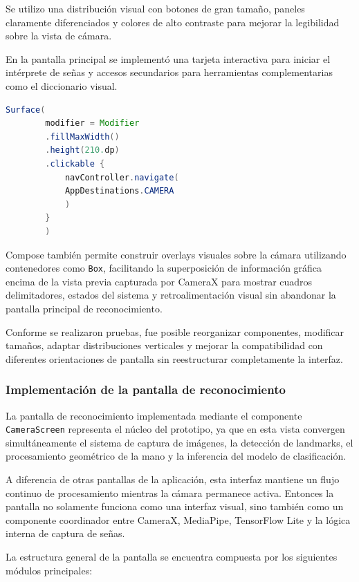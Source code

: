	Se utilizo una distribución visual con botones de gran tamaño, paneles claramente diferenciados y colores de alto contraste para mejorar la legibilidad sobre la vista de cámara.
	
	En la pantalla principal se implementó una tarjeta interactiva para iniciar el intérprete de señas y accesos secundarios para herramientas complementarias como el diccionario visual.
	
	\begin{lstlisting}[language=Java]
		Surface(
		modifier = Modifier
		.fillMaxWidth()
		.height(210.dp)
		.clickable {
			navController.navigate(
			AppDestinations.CAMERA
			)
		}
		)
	\end{lstlisting}
	
	Compose también permite construir overlays visuales sobre la cámara utilizando contenedores como \texttt{Box}, facilitando la superposición de información gráfica encima de la vista previa capturada por CameraX para mostrar cuadros delimitadores, estados del sistema y retroalimentación visual sin abandonar la pantalla principal de reconocimiento.
	
	Conforme se realizaron pruebas, fue posible reorganizar componentes, modificar tamaños, adaptar distribuciones verticales y mejorar la compatibilidad con diferentes orientaciones de pantalla sin reestructurar completamente la interfaz.
		
	\subsubsection{Implementación de la pantalla de reconocimiento}
	
	La pantalla de reconocimiento implementada mediante el componente
	\texttt{CameraScreen} representa el núcleo del prototipo,
	ya que en esta vista convergen simultáneamente el sistema de captura
	de imágenes, la detección de landmarks, el procesamiento geométrico
	de la mano y la inferencia del modelo de clasificación.
	
	A diferencia de otras pantallas de la aplicación, esta interfaz mantiene
	un flujo continuo de procesamiento mientras la cámara permanece activa.
	Entonces la pantalla no solamente funciona como una interfaz visual,
	sino también como un componente coordinador entre CameraX, MediaPipe,
	TensorFlow Lite y la lógica interna de captura de señas.
	
	La estructura general de la pantalla se encuentra compuesta por los
	siguientes módulos principales:
	
